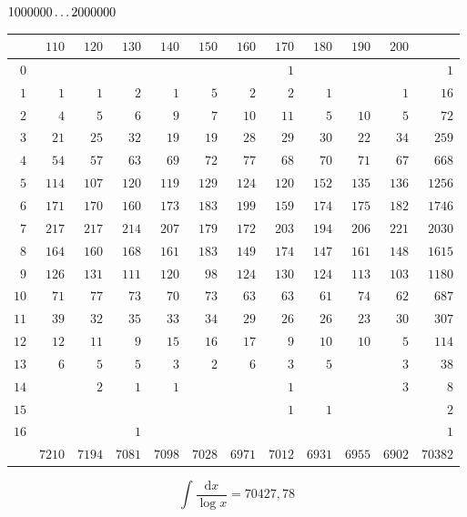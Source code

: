 \clearpage
\noindent\begin{minipage}{\linewidth}\centering
{}
\(1000000\mathinner{.\,.\,.}2000000\)\par\smallskip
\begingroup\fontsize{10}{10.5}\selectfont\setlength{\tabcolsep}{3.5pt}\renewcommand{\arraystretch}{1}
\begin{tabular}{r|rrrrrrrrrr|r}\hline
 & $110$ & $120$ & $130$ & $140$ & $150$ & $160$ & $170$ & $180$ & $190$ & $200$ &  \\ \hline
$0$ &  &  &  &  &  &  & $1$ &  &  &  & $1$ \\
$1$ & $1$ & $1$ & $2$ & $1$ & $5$ & $2$ & $2$ & $1$ &  & $1$ & $16$ \\
$2$ & $4$ & $5$ & $6$ & $9$ & $7$ & $10$ & $11$ & $5$ & $10$ & $5$ & $72$ \\
$3$ & $21$ & $25$ & $32$ & $19$ & $19$ & $28$ & $29$ & $30$ & $22$ & $34$ & $259$ \\
$4$ & $54$ & $57$ & $63$ & $69$ & $72$ & $77$ & $68$ & $70$ & $71$ & $67$ & $668$ \\
$5$ & $114$ & $107$ & $120$ & $119$ & $129$ & $124$ & $120$ & $152$ & $135$ & $136$ & $1256$ \\
$6$ & $171$ & $170$ & $160$ & $173$ & $183$ & $199$ & $159$ & $174$ & $175$ & $182$ & $1746$ \\
$7$ & $217$ & $217$ & $214$ & $207$ & $179$ & $172$ & $203$ & $194$ & $206$ & $221$ & $2030$ \\
$8$ & $164$ & $160$ & $168$ & $161$ & $183$ & $149$ & $174$ & $147$ & $161$ & $148$ & $1615$ \\
$9$ & $126$ & $131$ & $111$ & $120$ & $98$ & $124$ & $130$ & $124$ & $113$ & $103$ & $1180$ \\
$10$ & $71$ & $77$ & $73$ & $70$ & $73$ & $63$ & $63$ & $61$ & $74$ & $62$ & $687$ \\
$11$ & $39$ & $32$ & $35$ & $33$ & $34$ & $29$ & $26$ & $26$ & $23$ & $30$ & $307$ \\
$12$ & $12$ & $11$ & $9$ & $15$ & $16$ & $17$ & $9$ & $10$ & $10$ & $5$ & $114$ \\
$13$ & $6$ & $5$ & $5$ & $3$ & $2$ & $6$ & $3$ & $5$ &  & $3$ & $38$ \\
$14$ &  & $2$ & $1$ & $1$ &  &  & $1$ &  &  & $3$ & $8$ \\
$15$ &  &  &  &  &  &  & $1$ & $1$ &  &  & $2$ \\
$16$ &  &  & $1$ &  &  &  &  &  &  &  & $1$ \\
\hline
 & $7210$ & $7194$ & $7081$ & $7098$ & $7028$ & $6971$ & $7012$ & $6931$ & $6955$ & $6902$ & $70382$ \\ \hline
\end{tabular}\par\endgroup
\setlength{\abovedisplayskip}{6pt}\setlength{\belowdisplayskip}{4pt}
\[\int\frac{\mathrm{d}x}{\log x}=70427{,}78\]
\end{minipage}

